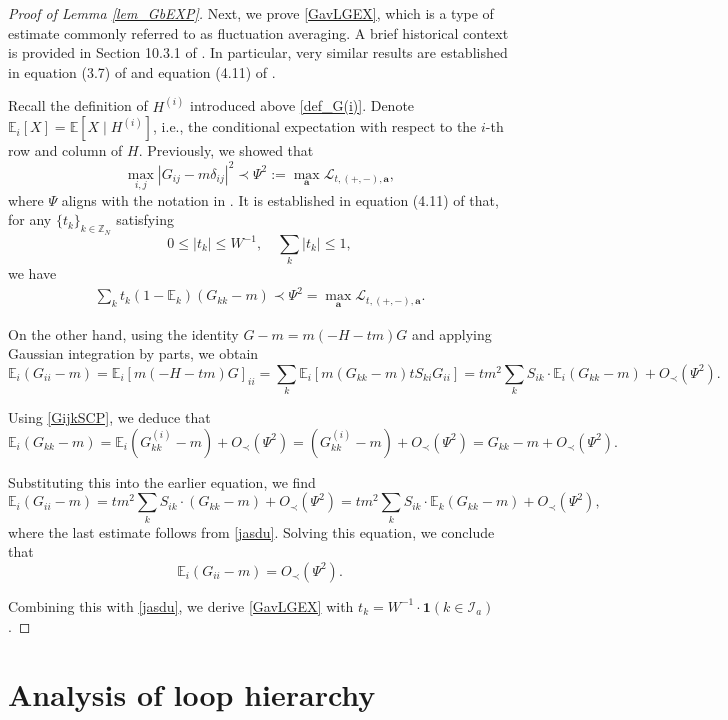 \documentclass[10pt,reqno]{article}
\theoremstyle{plain} %
\theoremstyle{remark}
\numberwithin{equation}{section}
\begin{document}
\begin{proof}[Proof of Lemma \ref{lem_GbEXP}]
Next, we prove \eqref{GavLGEX}, which is a type of estimate commonly referred to as fluctuation averaging. A brief historical context is provided in Section 10.3.1 of \cite{erdHos2017dynamical}. In particular, very similar results are established in equation (3.7) of \cite{Average_fluc} and equation (4.11) of \cite{erdHos2013local}. 

Recall the definition of $H^{(i)}$ introduced above \eqref{def_G(i)}. Denote $\mathbb{E}_i[X] = \mathbb{E}[X \mid H^{(i)}]$, i.e., the conditional expectation with respect to the $i$-th row and column of $H$. Previously, we showed that 
\[
\max_{i,j}|G_{ij}-m\delta_{ij}|^2 \prec \Psi^2 := \max_{\mathbf{a}} \mathcal{L}_{t, (+,-), \mathbf{a}},
\]
where $\Psi$ aligns with the notation in \cite{erdHos2013local}. It is established in equation (4.11) of \cite{erdHos2013local} that, for any $\{t_k\}_{k \in \mathbb{Z}_N}$ satisfying 
\[
0 \leq \left|t_k\right| \leq W^{-1}, \quad \sum_k \left|t_k\right| \leq 1,
\]
we have
\begin{align} \label{jasdu}
\sum_k t_k (1 - \mathbb{E}_k)(G_{kk} - m) \prec \Psi^2 = \max_{\mathbf{a}} \mathcal{L}_{t, (+,-), \mathbf{a}}.
\end{align}

On the other hand, using the identity $G - m = m(-H - tm)G$ and applying Gaussian integration by parts, we obtain 
\[
\mathbb{E}_i(G_{ii} - m) =  \mathbb{E}_i[m(-H -tm)G]_{ii} = \sum_k \mathbb{E}_i[m(G_{kk} - m) tS_{ki} G_{ii}] = t m^2 \sum_k S_{ik} \cdot \mathbb{E}_i(G_{kk} - m) + O_\prec(\Psi^2).
\]

Using \eqref{GijkSCP}, we deduce that
\[
\mathbb{E}_i(G_{kk} - m) = \mathbb{E}_i(G_{kk}^{(i)} - m) + O_\prec(\Psi^2) = (G_{kk}^{(i)} - m) + O_\prec(\Psi^2) = G_{kk} - m + O_\prec(\Psi^2).
\]

Substituting this into the earlier equation, we find
\[
\mathbb{E}_i(G_{ii} - m) =t m^2 \sum_k S_{ik} \cdot (G_{kk} - m) + O_\prec(\Psi^2) 
= t m^2 \sum_k S_{ik} \cdot \mathbb{E}_k(G_{kk} - m) + O_\prec(\Psi^2),
\]
where the last estimate follows from \eqref{jasdu}. Solving this equation, we conclude that
\[
\mathbb{E}_i(G_{ii} - m) = O_\prec(\Psi^2).
\]

Combining this with \eqref{jasdu}, we derive \eqref{GavLGEX} with $t_k = W^{-1}\cdot \mathbf{1}(k \in \mathcal{I}_a)$.




 \end{proof}

\section{Analysis of loop hierarchy}\label{Sec:Stoflo}
\end{document}
